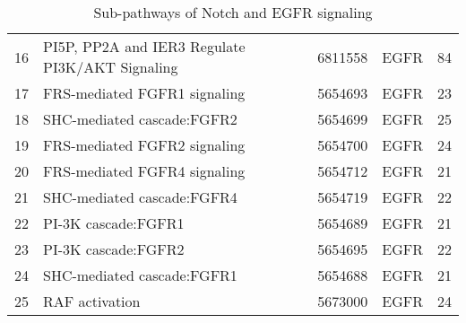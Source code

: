\documentclass[11pt]{article}
\begin{document}
\begin{table}[ht]
\begin{tabular}{rlllr}
  16 & PI5P, PP2A and IER3 Regulate PI3K/AKT Signaling & 6811558 & EGFR & 84 \\ 
  17 & FRS-mediated FGFR1 signaling & 5654693 & EGFR & 23 \\ 
  18 & SHC-mediated cascade:FGFR2 & 5654699 & EGFR & 25 \\ 
  19 & FRS-mediated FGFR2 signaling & 5654700 & EGFR & 24 \\ 
  20 & FRS-mediated FGFR4 signaling & 5654712 & EGFR & 21 \\ 
  21 & SHC-mediated cascade:FGFR4 & 5654719 & EGFR & 22 \\ 
  22 & PI-3K cascade:FGFR1 & 5654689 & EGFR & 21 \\ 
  23 & PI-3K cascade:FGFR2 & 5654695 & EGFR & 22 \\ 
  24 & SHC-mediated cascade:FGFR1 & 5654688 & EGFR & 21 \\ 
  25 & RAF activation & 5673000 & EGFR & 24 \\ 
   \hline
\end{tabular}
\caption{Sub-pathways of Notch and EGFR signaling} 
\end{table}

\end{document}
